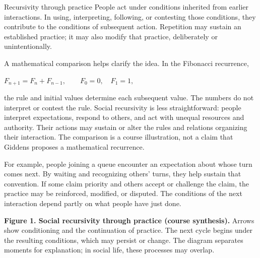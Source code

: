 \documentclass[11pt,a4paper]{article}
\newenvironment{fitdisplay}{\par\medskip\noindent\begin{lrbox}{\displaybox}$\displaystyle}{%
$\end{lrbox}\makebox[\linewidth][c]{\ifdim\wd\displaybox>\linewidth\resizebox{\linewidth}{!}{\usebox{\displaybox}}\else\usebox{\displaybox}\fi}\par\medskip}
\begin{document}
\begin{principle}{Recursivity through practice}
People act under conditions inherited from earlier interactions. In using, interpreting, following, or contesting those conditions, they contribute to the conditions of subsequent action. Repetition may sustain an established practice; it may also modify that practice, deliberately or unintentionally.
\end{principle}

A mathematical comparison helps clarify the idea. In the Fibonacci recurrence,
\begin{fitdisplay}
F_{n+1}=F_n+F_{n-1},\qquad F_0=0,\quad F_1=1,
\end{fitdisplay}
the rule and initial values determine each subsequent value. The numbers do not interpret or contest the rule. Social recursivity is less straightforward: people interpret expectations, respond to others, and act with unequal resources and authority. Their actions may sustain or alter the rules and relations organizing their interaction. The comparison is a course illustration, not a claim that Giddens proposes a mathematical recurrence.

For example, people joining a queue encounter an expectation about whose turn comes next. By waiting and recognizing others' turns, they help sustain that convention. If some claim priority and others accept or challenge the claim, the practice may be reinforced, modified, or disputed. The conditions of the next interaction depend partly on what people have just done.

\begin{center}
\end{center}
{\small\textbf{Figure 1. Social recursivity through practice (course synthesis).} Arrows show conditioning and the continuation of practice. The next cycle begins under the resulting conditions, which may persist or change. The diagram separates moments for explanation; in social life, these processes may overlap.}
\end{document}
